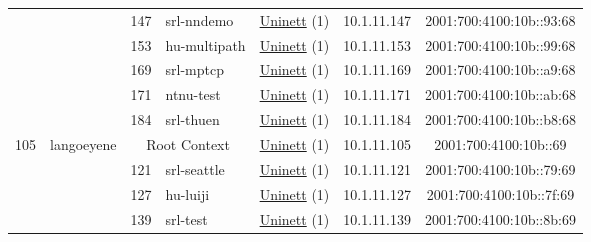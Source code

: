 \begin{small}
\begin{center}
\begin{longtable}{|c|c|c|c|c|c|c|c|}
  &  & \tiny{147} & \multicolumn{1}{|l|}{\tiny{srl-nndemo}} & \multicolumn{2}{|c|}{\tiny{\href{https://www.uninett.no}{Uninett} (1)}} & \tiny{10.1.11.147} & \tiny{2001:700:4100:10b::93:68} \\* \cline{3-3}\cline{4-4}\cline{5-5}\cline{6-6}\cline{7-7}\cline{8-8}
  &  & \tiny{153} & \multicolumn{1}{|l|}{\tiny{hu-multipath}} & \multicolumn{2}{|c|}{\tiny{\href{https://www.uninett.no}{Uninett} (1)}} & \tiny{10.1.11.153} & \tiny{2001:700:4100:10b::99:68} \\* \cline{3-3}\cline{4-4}\cline{5-5}\cline{6-6}\cline{7-7}\cline{8-8}
  &  & \tiny{169} & \multicolumn{1}{|l|}{\tiny{srl-mptcp}} & \multicolumn{2}{|c|}{\tiny{\href{https://www.uninett.no}{Uninett} (1)}} & \tiny{10.1.11.169} & \tiny{2001:700:4100:10b::a9:68} \\* \cline{3-3}\cline{4-4}\cline{5-5}\cline{6-6}\cline{7-7}\cline{8-8}
  &  & \tiny{171} & \multicolumn{1}{|l|}{\tiny{ntnu-test}} & \multicolumn{2}{|c|}{\tiny{\href{https://www.uninett.no}{Uninett} (1)}} & \tiny{10.1.11.171} & \tiny{2001:700:4100:10b::ab:68} \\* \cline{3-3}\cline{4-4}\cline{5-5}\cline{6-6}\cline{7-7}\cline{8-8}
  &  & \tiny{184} & \multicolumn{1}{|l|}{\tiny{srl-thuen}} & \multicolumn{2}{|c|}{\tiny{\href{https://www.uninett.no}{Uninett} (1)}} & \tiny{10.1.11.184} & \tiny{2001:700:4100:10b::b8:68} \\ \hline
 \multirow{7}{*}{\tiny{105}} & \multicolumn{1}{|l|}{\multirow{7}{*}{\tiny{langoeyene}}} & \multicolumn{2}{|c|}{\tiny{Root Context}} & \multicolumn{2}{|c|}{\tiny{\href{https://www.uninett.no}{Uninett} (1)}} & \tiny{10.1.11.105} & \tiny{2001:700:4100:10b::69} \\* \cline{3-3}\cline{4-4}\cline{5-5}\cline{6-6}\cline{7-7}\cline{8-8}
  &  & \tiny{121} & \multicolumn{1}{|l|}{\tiny{srl-seattle}} & \multicolumn{2}{|c|}{\tiny{\href{https://www.uninett.no}{Uninett} (1)}} & \tiny{10.1.11.121} & \tiny{2001:700:4100:10b::79:69} \\* \cline{3-3}\cline{4-4}\cline{5-5}\cline{6-6}\cline{7-7}\cline{8-8}
  &  & \tiny{127} & \multicolumn{1}{|l|}{\tiny{hu-luiji}} & \multicolumn{2}{|c|}{\tiny{\href{https://www.uninett.no}{Uninett} (1)}} & \tiny{10.1.11.127} & \tiny{2001:700:4100:10b::7f:69} \\* \cline{3-3}\cline{4-4}\cline{5-5}\cline{6-6}\cline{7-7}\cline{8-8}
  &  & \tiny{139} & \multicolumn{1}{|l|}{\tiny{srl-test}} & \multicolumn{2}{|c|}{\tiny{\href{https://www.uninett.no}{Uninett} (1)}} & \tiny{10.1.11.139} & \tiny{2001:700:4100:10b::8b:69} \\* \cline{3-3}\cline{4-4}\cline{5-5}\cline{6-6}\cline{7-7}\cline{8-8}

\end{longtable}
\end{center}
\end{small}
